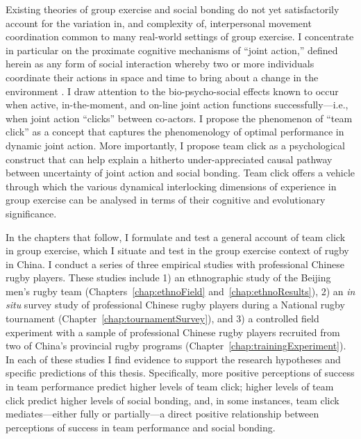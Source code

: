 \begin{CJK}{UTF8}{gbsn}
Existing theories of group exercise and social bonding do not yet satisfactorily account for the variation in, and complexity of, interpersonal movement coordination common to many real-world settings of group exercise.  I concentrate in particular on the proximate cognitive mechanisms of ``joint action,'' defined herein as any form of social interaction whereby two or more individuals coordinate their actions in space and time to bring about a change in the environment \citep{Sebanz2006}.  I draw attention to the bio-psycho-social effects known to occur when active, in-the-moment, and on-line joint action functions successfully---i.e., when joint action ``clicks'' between co-actors.  I propose the phenomenon of ``team click'' as a concept that captures the phenomenology of optimal performance in dynamic joint action.  More importantly, I propose team click as a psychological construct that can help explain a hitherto under-appreciated causal pathway between uncertainty of joint action and social bonding.  Team click offers a vehicle through which the various dynamical interlocking dimensions of experience in group exercise can be analysed in terms of their cognitive and evolutionary significance.


In the chapters that follow, I formulate and test a general account of team click in group exercise, which I situate and test in the group exercise context of rugby in China.  I conduct a series of three empirical studies with professional Chinese rugby players.  These studies include 1) an ethnographic study of the Beijing men's rugby team (Chapters~\ref{chap:ethnoField} and~\ref{chap:ethnoResults}), 2) an \textit{in situ} survey study of professional Chinese rugby players during a National rugby tournament (Chapter~\ref{chap:tournamentSurvey}), and 3) a controlled field experiment with a sample of professional Chinese rugby players recruited from two of China's provincial rugby programs (Chapter~\ref{chap:trainingExperiment}).  In each of these studies I find evidence to support the research hypotheses and specific predictions of this thesis.  Specifically, more positive perceptions of success in team performance predict higher levels of team click; higher levels of team click predict higher levels of social bonding, and, in some instances, team click mediates---either fully or partially---a direct positive relationship between perceptions of success in team performance and social bonding.


\end{CJK}
